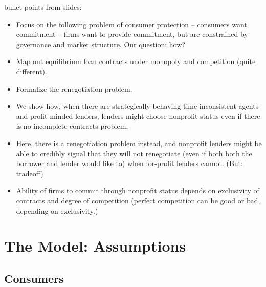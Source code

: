 \documentclass[11pt]{article}%
\begin{document}
\bigskip

bullet points from slides:

\begin{itemize}
\item Focus on the following problem of consumer protection -- consumers want
commitment -- firms want to provide commitment, but are constrained by
governance and market structure. Our question: how?

\item Map out equilibrium loan contracts under monopoly and competition (quite different).

\item Formalize the renegotiation problem.

\item We show how, when there are strategically behaving time-inconsistent
agents and profit-minded lenders, lenders might choose nonprofit status even
if there is no incomplete contracts problem.

\item Here, there is a renegotiation problem instead, and nonprofit lenders
might be able to credibly signal that they will not renegotiate (even if both
both the borrower and lender would like to) when for-profit lenders cannot.
(But: tradeoff)

\item Ability of firms to commit through nonprofit status depends on
exclusivity of contracts and degree of competition (perfect competition can be
good or bad, depending on exclusivity.)
\end{itemize}

\section{The Model: Assumptions}

\subsection{Consumers}
\end{document}
